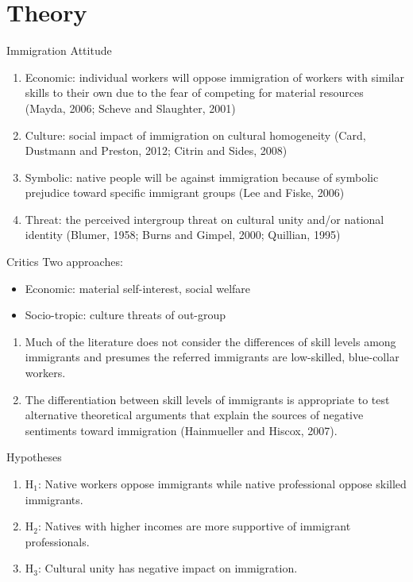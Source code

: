 \documentclass[12pt]{beamer}
\begin{document}
\section{Theory}
\begin{frame}{Immigration Attitude}
\begin{enumerate} 
\item Economic: individual workers will oppose immigration of workers with similar skills to their own due to the fear of competing for material resources (Mayda, 2006; Scheve and Slaughter, 2001)
\item Culture: social impact of immigration on cultural homogeneity (Card, Dustmann and Preston, 2012; Citrin and Sides, 2008)
\item Symbolic: native people will be against immigration because of symbolic prejudice toward specific immigrant groups (Lee and Fiske, 2006)
\item Threat: the perceived intergroup threat on cultural unity and/or national identity  (Blumer, 1958; Burns and Gimpel, 2000; Quillian, 1995)
\end{enumerate}
\end{frame}
\begin{frame}{Critics}
Two approaches:
\begin{itemize}
\item Economic: material self-interest, social welfare
\item Socio-tropic: culture threats of out-group
\end{itemize}
\begin{enumerate}
\item Much of the literature does not consider the differences of skill levels among immigrants and presumes the referred immigrants are low-skilled, blue-collar workers. 
\item The differentiation between skill levels of immigrants is appropriate to test alternative theoretical arguments that explain the sources of negative sentiments toward immigration (Hainmueller and Hiscox, 2007).
\end{enumerate}
 \end{frame}
\begin{frame}{Hypotheses}
\begin{enumerate}
\item $\text{H}_{1}$: Native workers oppose immigrants while native professional oppose skilled immigrants.
\item $\text{H}_{2}$: Natives with higher incomes are more supportive of immigrant professionals.
\item $\text{H}_{3}$: Cultural unity has negative impact on immigration.
\end{enumerate}
 \end{frame}
 
\end{document}
